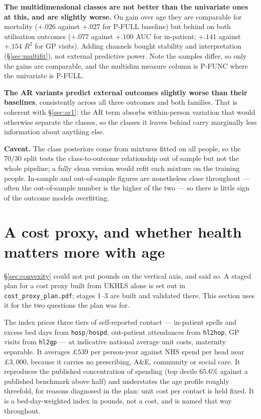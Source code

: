 \documentclass[11pt]{article}
\newcommand{\code}[1]{\texttt{\small #1}}
\begin{document}
\textbf{The multidimensional classes are not better than the univariate ones
at this, and are slightly worse.} On gain over age they are comparable for
mortality ($+.026$ against $+.027$ for P-FULL baseline) but behind on both
utilisation outcomes ($+.077$ against $+.100$ AUC for in-patient; $+.141$
against $+.154$ $R^2$ for GP visits). Adding channels bought stability and
interpretation (\S\ref{sec:multifit}), not external predictive power. Note
the samples differ, so only the gains are comparable, and the multidim
measure column is P-FUNC where the univariate is P-FULL.

\textbf{The AR variants predict external outcomes slightly worse than their
baselines}, consistently across all three outcomes and both families. That is
coherent with \S\ref{sec:ar1}: the AR term absorbs within-person variation
that would otherwise separate the classes, so the classes it leaves behind
carry marginally less information about anything else.

\textbf{Caveat.} The class posteriors come from mixtures fitted on all
people, so the $70/30$ split tests the class-to-outcome relationship out of
sample but not the whole pipeline; a fully clean version would refit each
mixture on the training people. In-sample and out-of-sample figures are
nonetheless close throughout --- often the out-of-sample number is the higher
of the two --- so there is little sign of the outcome models overfitting.

\section{A cost proxy, and whether health matters more with age}
\label{sec:costproxy}

\S\ref{sec:convexity} could not put pounds on the vertical axis, and said so.
A staged plan for a cost proxy built from UKHLS alone is set out in
\code{cost\_proxy\_plan.pdf}; stages 1--3 are built and validated there. This
section uses it for the two questions the plan was for.

The index prices three tiers of self-reported contact --- in-patient spells
and excess bed days from \code{hosp}/\code{hospd}, out-patient attendances
from \code{hl2hop}, GP visits from \code{hl2gp} --- at indicative national
average unit costs, maternity separable. It averages $\pounds539$ per
person-year against NHS spend per head near $\pounds3{,}000$, because it
carries no prescribing, A\&E, community or social care. It reproduces the
published concentration of spending (top decile $65.6\%$ against a published
benchmark above half) and understates the age profile roughly threefold, for
reasons diagnosed in the plan: unit cost per contact is held fixed. It is a
bed-day-weighted index in pounds, not a cost, and is named that way
throughout.
\end{document}

